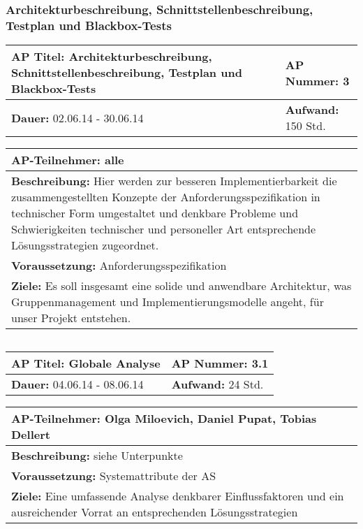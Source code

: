 \subsubsection{Architekturbeschreibung, Schnittstellenbeschreibung, Testplan und Blackbox-Tests}

\begin{tabular}{|p{7.43cm}|p{7.43cm}|}
\hline
\textbf{AP Titel: }Architekturbeschreibung, Schnittstellenbeschreibung, Testplan und Blackbox-Tests & \textbf{AP Nummer: }3\\ 
\hline
\textbf{Dauer: }02.06.14 - 30.06.14& \textbf{Aufwand: }150 Std.\\
\hline
\end{tabular}
\begin{tabular}{|p{15.3cm}|}
\hline
\textbf{AP-Teilnehmer: }alle\\
\hline
\textbf{Beschreibung: }Hier werden zur besseren Implementierbarkeit die zusammengestellten Konzepte der Anforderungsspezifikation in technischer Form umgestaltet und denkbare Probleme und Schwierigkeiten technischer und personeller Art entsprechende Lösungsstrategien zugeordnet.  \\
\hline
\textbf{Voraussetzung: }Anforderungsspezifikation\\
\hline 
\textbf{Ziele: }Es soll insgesamt eine solide und anwendbare Architektur, was Gruppenmanagement und Implementierungsmodelle angeht,  für unser Projekt entstehen.\\
\hline 
\end{tabular}
\begin{verbatim}

\end{verbatim}

\begin{tabular}{|p{7.43cm}|p{7.43cm}|}
\hline
\textbf{AP Titel: }Globale Analyse & \textbf{AP Nummer: }3.1\\ 
\hline
\textbf{Dauer: }04.06.14 - 08.06.14& \textbf{Aufwand: }24 Std.\\
\hline
\end{tabular}
\begin{tabular}{|p{15.3cm}|}
\hline
\textbf{AP-Teilnehmer: }Olga Miloevich, Daniel Pupat, Tobias Dellert\\
\hline
\textbf{Beschreibung: }siehe Unterpunkte\\
\hline
\textbf{Voraussetzung: }Systemattribute der AS\\
\hline 
\textbf{Ziele: }Eine umfassende Analyse denkbarer Einflussfaktoren und ein ausreichender Vorrat an entsprechenden Lösungsstrategien\\
\hline 
\end{tabular}
\begin{verbatim}

\end{verbatim}

